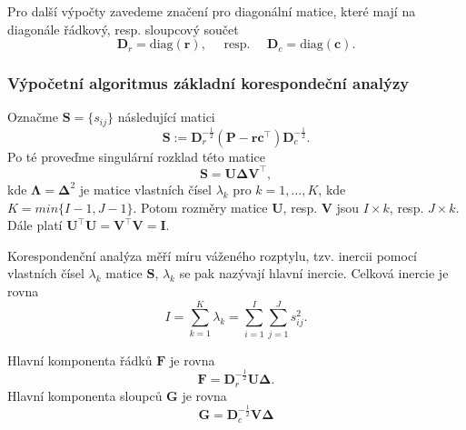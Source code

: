Pro další výpočty zavedeme značení pro diagonální matice, které mají na diagonále  řádkový, resp. sloupcový součet
\begin{equation}
    \mathbf{D}_r = \mbox{diag}(\bm{r}), \quad \mbox{ resp. } \quad \mathbf{D}_c = \mbox{diag}(\bm{c}).
\end{equation}


\subsubsection[Výpočetní algoritmus základní korespondeční analýzy]{Výpočetní algoritmus základní korespondeční analýzy \cite{bib:CA1,bib:MCA2}}
Označme $\mathbf{S}  = \{s_{ij}\}$ následující matici
\begin{equation}
    \mathbf{S} := \mathbf{D}_r^{-\frac{1}{2}} (\mathbf{P} - \bm{rc}^\top) \mathbf{D}_c^{-\frac{1}{2}}.
\end{equation}
Po té proveďme singulární rozklad této matice
\begin{equation}
    \mathbf{S} = \mathbf{U}\mathbf{\Delta}\mathbf{V}^\top,
\end{equation}
kde $\mathbf{\Lambda} = \mathbf{\Delta}^2$ je matice vlastních čísel $\lambda_k$ pro $k=1,\ldots,K$, kde $K=min\{I-1,J-1\}$. Potom rozměry matice $\mathbf{U}$, resp. $\mathbf{V}$ jsou $I\times k$, resp.  $J\times k$. Dále platí $\mathbf{U}^\top\mathbf{U}=\mathbf{V}^\top\mathbf{V}=\mathbf{I}$.%


Korespondenční analýza měří míru váženého rozptylu, tzv. inercii pomocí vlastních čísel $\lambda_k$ matice $\mathbf{S}$, $\lambda_k$ se pak nazývají hlavní inercie.
Celková inercie je rovna
\begin{equation}
    I = \sum_{k=1}^{K} \lambda_k = \sum_{i=1}^{I}\sum_{j=1}^{J} s_{ij}^2.
\end{equation}

Hlavní komponenta řádků $\mathbf{F}$ je rovna
\begin{equation}
    \mathbf{F} = \mathbf{D}_r^{-\frac{1}{2}} \mathbf{U}  \mathbf{\Delta}.
\end{equation}
Hlavní komponenta sloupců $\mathbf{G}$ je rovna
\begin{equation}
    \mathbf{G} = \mathbf{D}_c^{-\frac{1}{2}} \mathbf{V}  \mathbf{\Delta}
\end{equation}

